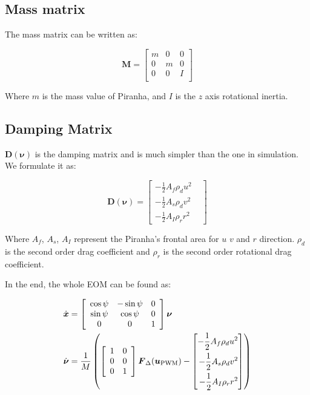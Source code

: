 \subsection{Mass matrix}

The mass matrix can be written as:

\begin{equation}
    \boldsymbol{M}=\left[\begin{array}{ccc}
        m & 0 & 0 \\
        0 & m & 0 \\
        0 & 0 & I \\
    \end{array}\right]
\end{equation}

Where $m$ is the mass value of Piranha, and $I$ is the $z$ axis rotational inertia.

\subsection{Damping Matrix}

$\boldsymbol{D}(\boldsymbol{\nu})$ is the damping matrix and is much simpler than the one in simulation. We formulate it as:

\begin{equation}
    \boldsymbol{D}(\boldsymbol{\nu})=\left[\begin{aligned}
        -\frac{1}{2}A_f \rho_d u^2 & \\
        -\frac{1}{2}A_s \rho_d v^2 & \\
        -\frac{1}{2}A_I \rho_r r^2 &
    \end{aligned}\right]
\end{equation}

Where $A_f$, $A_s$, $A_I$ represent the Piranha's frontal area for $u$ $v$ and $r$ direction. $\rho_d$ is the second order drag coefficient and $\rho_r$ is the second order rotational drag coefficient.

In the end, the whole EOM can be found as:

\begin{align}
    \dot{\boldsymbol{x}} & =\left[\begin{array}{ccc}
        \cos{\psi} & -\sin{\psi} & 0  \\
        \sin{\psi} & \cos{\psi} & 0 \\
        0 & 0 & 1
    \end{array}\right]\boldsymbol{\nu} \\
    \dot{\boldsymbol{\nu}} & =\frac{1}{M}\left(\left[\begin{array}{cc}
        1 & 0 \\
        0 & 0\\
        0 & 1 
    \end{array}\right]\boldsymbol{F}_\Delta(\boldsymbol{u}_{\rm PWM})-\left[\begin{aligned}
        -\frac{1}{2}A_f \rho_d u^2 & \\
        -\frac{1}{2}A_s \rho_d v^2 & \\
        -\frac{1}{2}A_I \rho_r r^2 &
    \end{aligned}\right]\right)
\end{align}

